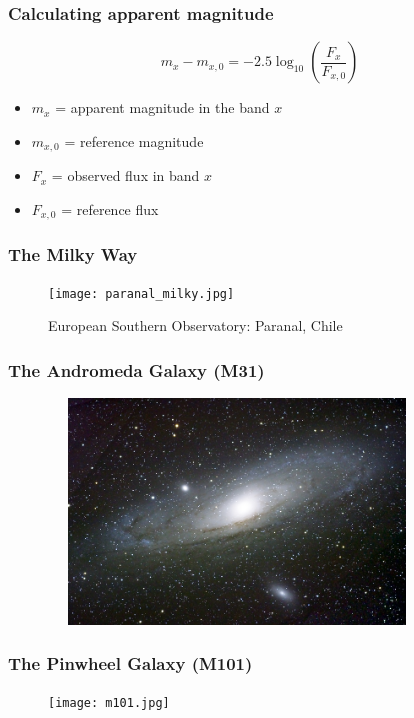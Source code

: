 \documentclass{beamer}
\begin{document}
\begin{frame}[t]
\frametitle{Calculating apparent magnitude}
\begin{equation}
m_{x}-m_{x,0} = -2.5 \log_{10}\left ( \frac{F_{x}}{F_{x,0}} \right )
\end{equation}
\begin{itemize}
	\item<2->$m_x$ = apparent magnitude in the band $x$
	\item<3->$m_{x,0}$ = reference magnitude
	\item<4->$F_x$ = observed flux in band $x$
	\item<5->$F_{x,0}$ = reference flux
\end{itemize}
\end{frame}


\begin{frame}
\frametitle{The Milky Way}
\begin{figure}
\texttt{[image: paranal\_milky.jpg]}
\caption{European Southern Observatory: Paranal, Chile}
\nocite{eso2013}
\end{figure}
\end{frame}

\begin{frame}
\frametitle{The Andromeda Galaxy (M31)}
\begin{figure}
\includegraphics[width=100mm, height=60mm]{m31.jpg}
\nocite{nasa2010}
\end{figure}
\end{frame}

\begin{frame}
\frametitle{The Pinwheel Galaxy (M101)}
\begin{figure}
\texttt{[image: m101.jpg]}
\nocite{nasa2010}
\end{figure}
\end{frame}
\end{document}
